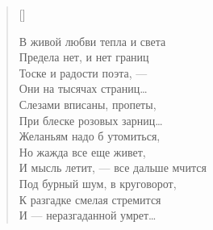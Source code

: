 

\settowidth{\versewidth}{В живой любви тепла и света}
\begin{verse}[\versewidth]
\begin{altverse}
В живой любви тепла и света\\
Предела нет, и нет границ\\
Тоске и радости поэта, --- \\
Они на тысячах страниц\ldots\\
Слезами вписаны, пропеты, \\
При блеске розовых зарниц\ldots\\
Желаньям надо б утомиться,\\
Но жажда все еще живет,\\
И мысль летит, --- все дальше мчится\\
Под бурный шум, в круговорот,\\
К разгадке смелая стремится\\
И --- неразгаданной умрет\ldots
\end{altverse}
\end{verse}

\newpage


